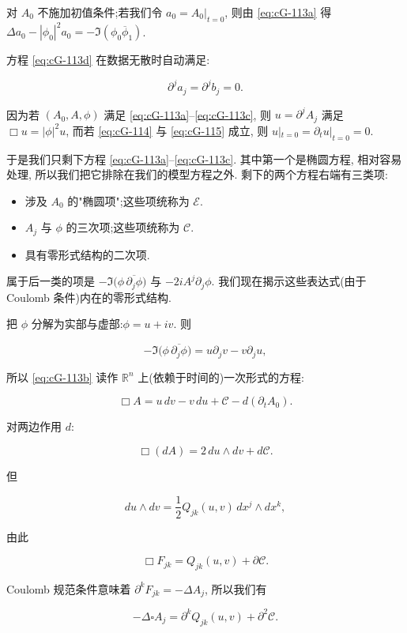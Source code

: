 对 $A_0$ 不施加初值条件;若我们令 $a_0 = A_0|_{t=0}$, 则由 \eqref{eq:cG-113a} 得 $\Delta a_0 - |\phi_0|^2 a_0 = -\Im(\phi_0\overline{\phi}_1)$. 

方程 \eqref{eq:cG-113d} 在数据无散时自动满足:

\begin{equation}
\partial^{j}a_{j} = \partial^{j}b_{j} = 0.\label{eq:cG-115}
\end{equation}

因为若 $(A_0,  A,  \phi)$ 满足 \eqref{eq:cG-113a}--\eqref{eq:cG-113c}, 则 $u = \partial^j A_j$ 满足 $\Box u = |\phi|^2 u$, 而若 \eqref{eq:cG-114} 与 \eqref{eq:cG-115} 成立, 则 $u|_{t=0} = \partial_t u|_{t=0} = 0$. 

于是我们只剩下方程 \eqref{eq:cG-113a}--\eqref{eq:cG-113c}. 其中第一个是椭圆方程, 相对容易处理, 所以我们把它排除在我们的模型方程之外. 剩下的两个方程右端有三类项:

\begin{itemize}
\item 涉及 $A_0$ 的"椭圆项";这些项统称为 $\mathcal{E}$. 
\item $A_{j}$ 与 $\phi$ 的三次项;这些项统称为 $\mathcal{C}$. 
\item 具有零形式结构的二次项. 
\end{itemize}

属于后一类的项是 $-\Im\big(\phi\, \overline{\partial_{j}\phi}\big)$ 与 $-2iA^{j}\partial_{j}\phi$. 我们现在揭示这些表达式(由于 Coulomb 条件)内在的零形式结构. 

把 $\phi$ 分解为实部与虚部:$\phi = u + iv$. 则

\[
-\Im\bigl(\phi\, \overline{\partial_{j}\phi}\bigr) = u\partial_{j}v - v\partial_{j}u, 
\]

所以 \eqref{eq:cG-113b} 读作 $\mathbb{R}^n$ 上(依赖于时间的)一次形式的方程:

\[
\Box A = u\, dv - v\, du + \mathcal{C} - d(\partial_{t}A_{0}).
\]

对两边作用 $d$:

\[
\Box(dA) = 2\, du \wedge dv + d\mathcal{C}.
\]

但

\[
du \wedge dv = \frac{1}{2}Q_{jk}(u,  v)\, dx^{j} \wedge dx^{k}, 
\]

由此

\[
\Box F_{jk} = Q_{jk}(u,  v) + \partial\mathcal{C}.
\]

Coulomb 规范条件意味着 $\partial^k F_{jk} = -\Delta A_j$, 所以我们有

\[
-\Delta\square A_{j} = \partial^{k}Q_{jk}(u,  v) + \partial^{2}\mathcal{C}.
\]

